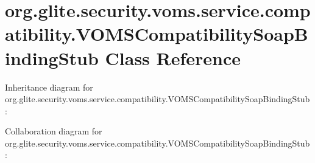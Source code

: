 \hypertarget{classorg_1_1glite_1_1security_1_1voms_1_1service_1_1compatibility_1_1VOMSCompatibilitySoapBindingStub}{
\section{org.glite.security.voms.service.compatibility.VOMSCompatibilitySoapBindingStub Class Reference}
\label{classorg_1_1glite_1_1security_1_1voms_1_1service_1_1compatibility_1_1VOMSCompatibilitySoapBindingStub}
}


Inheritance diagram for org.glite.security.voms.service.compatibility.VOMSCompatibilitySoapBindingStub:


Collaboration diagram for org.glite.security.voms.service.compatibility.VOMSCompatibilitySoapBindingStub:
